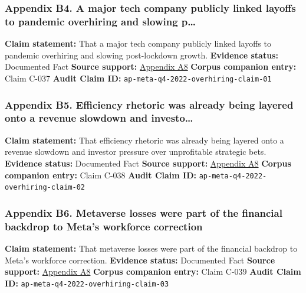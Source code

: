 \documentclass[
  american,
  11pt,
  letterpaper,
]{article}
\begin{document}
\subsubsection{Appendix B4. A major tech company publicly linked layoffs
to pandemic overhiring and slowing
p\ldots{}}\label{appendix-b4-a-major-tech-company-publicly-linked-layoffs-to-pandemic-overhiring-and-slowing-p}

\textbf{Claim statement:} That a major tech company publicly linked
layoffs to pandemic overhiring and slowing post-lockdown growth.
\textbf{Evidence status:} Documented Fact \textbf{Source support:}
\hyperref[appendix-a8-meta-posts-lower-q4-profit-announces-huge-stock-buyback]{Appendix
A8} \textbf{Corpus companion entry:} Claim C-037 \textbf{Audit Claim
ID:} \texttt{ap-meta-q4-2022-overhiring-claim-01}

\subsubsection{Appendix B5. Efficiency rhetoric was already being
layered onto a revenue slowdown and
investo\ldots{}}\label{appendix-b5-efficiency-rhetoric-was-already-being-layered-onto-a-revenue-slowdown-and-investo}

\textbf{Claim statement:} That efficiency rhetoric was already being
layered onto a revenue slowdown and investor pressure over unprofitable
strategic bets. \textbf{Evidence status:} Documented Fact \textbf{Source
support:}
\hyperref[appendix-a8-meta-posts-lower-q4-profit-announces-huge-stock-buyback]{Appendix
A8} \textbf{Corpus companion entry:} Claim C-038 \textbf{Audit Claim
ID:} \texttt{ap-meta-q4-2022-overhiring-claim-02}

\subsubsection{Appendix B6. Metaverse losses were part of the financial
backdrop to Meta's workforce
correction}\label{appendix-b6-metaverse-losses-were-part-of-the-financial-backdrop-to-meta-s-workforce-correction}

\textbf{Claim statement:} That metaverse losses were part of the
financial backdrop to Meta's workforce correction. \textbf{Evidence
status:} Documented Fact \textbf{Source support:}
\hyperref[appendix-a8-meta-posts-lower-q4-profit-announces-huge-stock-buyback]{Appendix
A8} \textbf{Corpus companion entry:} Claim C-039 \textbf{Audit Claim
ID:} \texttt{ap-meta-q4-2022-overhiring-claim-03}
\end{document}
